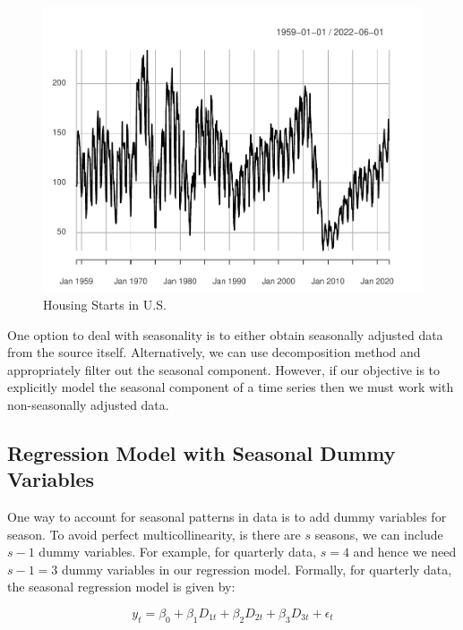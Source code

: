 \documentclass[]{book}
\theoremstyle{definition}
\theoremstyle{definition}
\theoremstyle{definition}
\theoremstyle{remark}
\begin{document}
\begin{figure}

{\centering \includegraphics[width=0.8\linewidth]{bookdown-demo_files/figure-latex/ch5-figure4-1} 

}

\caption{Housing Starts in U.S.}\label{fig:ch5-figure4}
\end{figure}

One option to deal with seasonality is to either obtain seasonally adjusted data from the source itself. Alternatively, we can use decomposition method and appropriately filter out the seasonal component. However, if our objective is to explicitly model the seasonal component of a time series then we must work with non-seasonally adjusted data.

\hypertarget{regression-model-with-seasonal-dummy-variables}{%
\subsection{Regression Model with Seasonal Dummy Variables}\label{regression-model-with-seasonal-dummy-variables}}

One way to account for seasonal patterns in data is to add dummy variables for season. To avoid perfect multicollinearity, is there are \(s\) seasons, we can include \(s-1\) dummy variables. For example, for quarterly data, \(s=4\) and hence we need \(s-1=3\) dummy variables in our regression model. Formally, for quarterly data, the seasonal regression model is given by:

\begin{equation}
y_t= \beta_0 + \beta_1 D_{1t}+ \beta_2 D_{2t} + \beta_3 D_{3t} + \epsilon_t
\end{equation}
\end{document}
